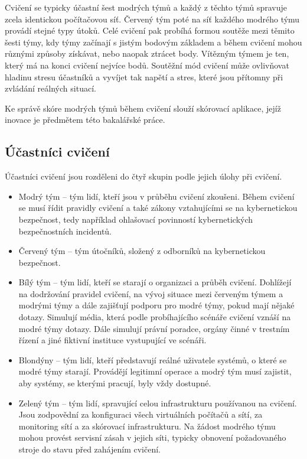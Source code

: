 \documentclass[
  digital, %
  twoside, %
  table,   %
  lof,     %
  lot,     %
]{fithesis3}
\begin{document}
Cvičení se typicky účastní šest modrých týmů a každý z těchto týmů spravuje zcela identickou počítačovou síť. Červený tým poté na síť každého modrého týmu provádí stejné typy útoků. Celé cvičení pak probíhá formou soutěže mezi těmito šesti týmy, kdy týmy začínají s jistým bodovým základem a během cvičení mohou různými způsoby získávat, nebo naopak ztrácet body. Vítězným týmem je ten, který má na konci cvičení nejvíce bodů. Soutěžní mód cvičení může ovlivňovat hladinu stresu účastníků a vyvíjet tak napětí a stres, které jsou přítomny při zvládání reálných situací.

Ke správě skóre modrých týmů během cvičení slouží skórovací aplikace, jejíž inovace je předmětem této bakalářské práce. 

\subsection{Účastníci cvičení}
Účastníci cvičení jsou rozděleni do čtyř skupin podle jejich úlohy při cvičení.

\begin{itemize}
\item Modrý tým -- tým lidí, kteří jsou v průběhu cvičení zkoušeni. Během cvičení se musí řídit pravidly cvičení a také zákony vztahujícími se na kybernetickou bezpečnost, tedy například ohlašovací povinností kybernetických bezpečnostních incidentů.
\item Červený tým -- tým útočníků, složený z odborníků na kybernetickou bezpečnost. 
\item Bílý tým -- tým lidí, kteří se starají o organizaci a průběh cvičení. Dohlížejí na dodržování pravidel cvičení, na vývoj situace mezi červeným týmem a modrými týmy a dále zajišťují podporu pro modré týmy, pokud mají nějaké dotazy. Simulují média, která podle probíhajícího scénáře cvičení vznáší na modré týmy dotazy. Dále simulují právní poradce, orgány činné v trestním řízení a jiné fiktivní instituce vystupující ve scénáři.
\item Blondýny -- tým lidí, kteří představují reálné uživatele systémů, o které se modré týmy starají. Provádějí legitimní operace a modrý tým musí zajistit, aby systémy, se kterými pracují, byly vždy dostupné.
\item Zelený tým -- tým lidí, spravující celou infrastrukturu používanou na cvičení. Jsou zodpovědní za konfiguraci všech virtuálních počítačů a sítí, za monitoring sítí a za skórovací infrastrukturu. Na žádost modrého týmu mohou provést servisní zásah v jejich síti, typicky obnovení požadovaného stroje do stavu před zahájením cvičení.
\end{itemize}
\end{document}
